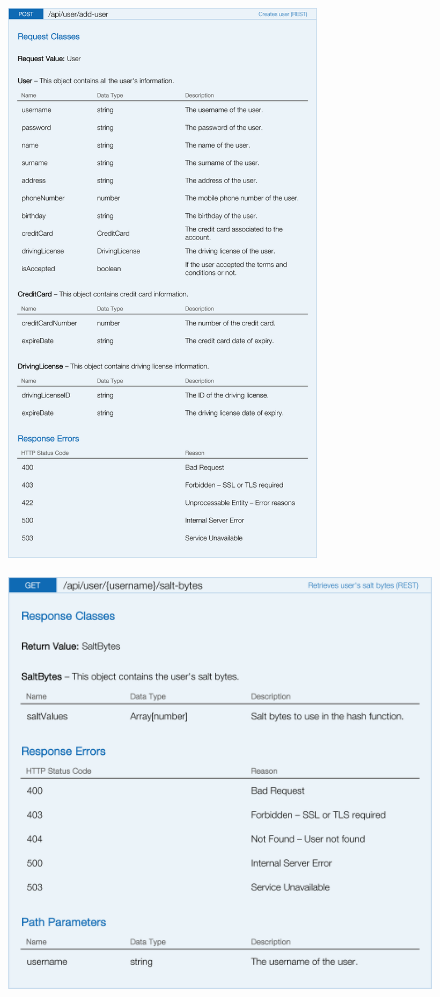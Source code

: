 \begin{figure}[H]
	\noindent
    	\centering
    	\includegraphics[height=550px, keepaspectratio]{apitables/APIAddUser.png}
    	\label{fig:api-add-user}
\end{figure}

\begin{figure}[H]
	\noindent
    	\centering
    	\includegraphics{apitables/APISaltBytes.png}
    	\label{fig:api-salt-bytes}
\end{figure}

